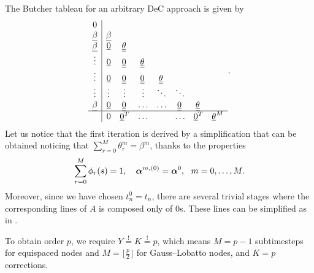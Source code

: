 The Butcher tableau for an arbitrary DeC approach is given by
\begin{equation}\label{eq:DeC_RK}
\begin{aligned}
\begin{array}{c|ccccccc}
	0 &  &&&&&&\\
\vec{\beta} & \vec{\beta} &  &   & & & & \\
\vec{\beta}  & \vec{0} &   \mat{{\theta}} & & & & & \\
\vdots &  \vec{0}& \mat{0}  &\mat{{\theta}}   && & & \\
\vdots & \vec{0} &  \mat{0}   &   \mat{0}  & \mat{{\theta}}  &  &  & \\
\vdots &  \vdots  &  \vdots &  \vdots &  \ddots  &  \ddots& &  \\
\vec{\beta} & \vec{0} &  \mat{0}  &  \hdots &  \hdots & \mat{0}  &  \mat{{\theta}} \\
\hline
&  0 & \vec{0}^T    & \hdots  &   &   \hdots &    \vec{0}^T& \vec{\theta}^{M} 
\end{array}.
\end{aligned}
\end{equation}
Let us notice that the first iteration is derived by a simplification that can be obtained noticing that $\sum_{r=0}^M \theta^m_r = \beta^m$, thanks to the properties
\begin{equation}\label{eq:sumoverthetaeqbeta}
\sum_{r=0}^{M}\phi_r(s)=1, \quad	\bc^{m,(0)}=\bc^0, \ \ 
m=0,\hdots ,M.
\end{equation}
Moreover, since we have chosen $t^0_n=t_n$, there are several trivial stages where the corresponding lines of $A$ is composed only of 0s.  These lines can be simplified as in \cite{Han_Veiga_2021,torlo2022}.
\begin{remark}
	To obtain order $p$, we require $Y\stackrel{!}{=}K\stackrel{!}{=}p$, which means $M=p-1$ subtimesteps for equispaced nodes and $M=\lfloor \frac{p}{2}\rfloor$ for Gauss--Lobatto nodes, and $K=p$ corrections. 
\end{remark}

